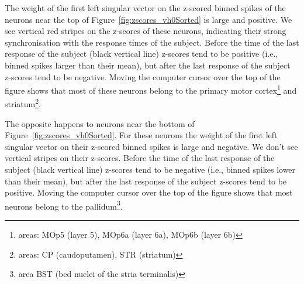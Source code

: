 \documentclass[12pt]{article}
\begin{document}
The weight of the first left singular vector on the z-scored binned spikes of
the neurons near the top of Figure~\ref{fig:zscores_vh0Sorted} is large and
positive. We see vertical red stripes on the z-scores of these neurons,
indicating their strong synchronisation with the response times of the subject.
%
Before the time of the last response of the subject (black vertical line)
z-scores tend to be positive (i.e., binned spikes larger than their mean), but
after the last response of the subject z-scores tend to be negative.
%
Moving the computer cursor over the top of the figure shows that most of these
neurons belong to the primary motor cortex\footnote{areas: MOp5 (layer 5),
MOp6a (layer 6a), MOp6b (layer 6b)} and striatum\footnote{areas: CP
(caudoputamen), STR (striatum)}.

The opposite happens to neurons near the bottom of
Figure~\ref{fig:zscores_vh0Sorted}. For these neurons the weight of the first
left singular vector on their z-scored binned spikes is large and negative. We
don't see vertical stripes on their z-scores. Before the time of the last
response of the subject (black vertical line) z-scores tend to be negative
(i.e., binned spikes lower than their mean), but after the last response of the
subject z-scores tend to be positive.
%
Moving the computer cursor over the top of the figure shows that most neurons
belong to the pallidum\footnote{area BST (bed nuclei of the stria terminalis)}.
\end{document}

